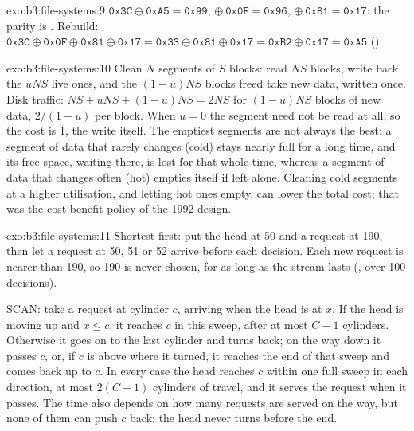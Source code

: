 \begin{solution}{exo:b3:file-systems:9}
$\mathtt{0x3C} \oplus \mathtt{0xA5} = \mathtt{0x99}$, $\oplus\ \mathtt{0x0F} = \mathtt{0x96}$, $\oplus\ \mathtt{0x81} = \mathtt{0x17}$: the parity is . Rebuild: $\mathtt{0x3C} \oplus \mathtt{0x0F} \oplus \mathtt{0x81} \oplus \mathtt{0x17} = \mathtt{0x33} \oplus \mathtt{0x81} \oplus \mathtt{0x17} = \mathtt{0xB2} \oplus \mathtt{0x17} = \mathtt{0xA5}$ ().
\end{solution}

\begin{solution}{exo:b3:file-systems:10}
Clean $N$ segments of $S$ blocks: read $NS$ blocks, write back the $uNS$ live ones, and the $(1 - u)NS$ blocks freed take new data, written once. Disk traffic: $NS + uNS + (1 - u)NS = 2NS$ for $(1 - u)NS$ blocks of new data, $2/(1 - u)$ per block. When $u = 0$ the segment need not be read at all, so the cost is 1, the write itself. The emptiest segments are not always the best: a segment of data that rarely changes (cold) stays nearly full for a long time, and its free space, waiting there, is lost for that whole time, whereas a segment of data that changes often (hot) empties itself if left alone. Cleaning cold segments at a higher utilisation, and letting hot ones empty, can lower the total cost; that was the cost-benefit policy of the 1992 design.
\end{solution}

\begin{solution}{exo:b3:file-systems:11}
Shortest  first: put the head at 50 and a request at 190, then let a request at 50, 51 or 52 arrive before each decision. Each new request is nearer than 190, so 190 is never chosen, for as long as the stream lasts (, over 100 decisions).

SCAN: take a request at cylinder $c$, arriving when the head is at $x$. If the head is moving up and $x \le c$, it reaches $c$ in this sweep, after at most $C - 1$ cylinders. Otherwise it goes on to the last cylinder and turns back; on the way down it passes $c$, or, if $c$ is above where it turned, it reaches the end of that sweep and comes back up to $c$. In every case the head reaches $c$ within one full sweep in each direction, at most $2(C - 1)$ cylinders of travel, and it serves the request when it passes. The time also depends on how many requests are served on the way, but none of them can push $c$ back: the head never turns before the end.
\end{solution}

